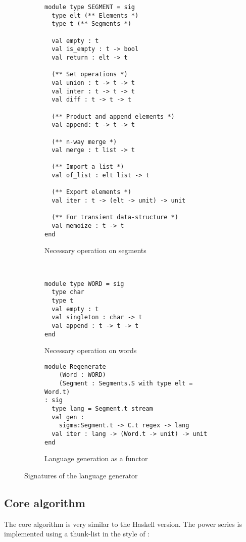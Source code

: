 \begin{figure}[h]
  \centering
  \begin{subfigure}{0.44\linewidth}
\begin{lstlisting}[basicstyle=\scriptsize\ttfamily]
module type SEGMENT = sig
  type elt (** Elements *)
  type t (** Segments *)

  val empty : t
  val is_empty : t -> bool
  val return : elt -> t

  (** Set operations *)
  val union : t -> t -> t
  val inter : t -> t -> t
  val diff : t -> t -> t

  (** Product and append elements *)
  val append: t -> t -> t

  (** n-way merge *)
  val merge : t list -> t

  (** Import a list *)
  val of_list : elt list -> t

  (** Export elements *)
  val iter : t -> (elt -> unit) -> unit

  (** For transient data-structure *)
  val memoize : t -> t
end
\end{lstlisting}
    \caption{Necessary operation on segments}
    \label{code:sigs:segment}
  \end{subfigure}~
  \begin{subfigure}{0.57\linewidth}
\begin{lstlisting}[basicstyle=\scriptsize\ttfamily]
module type WORD = sig
  type char
  type t
  val empty : t
  val singleton : char -> t
  val append : t -> t -> t
end
\end{lstlisting}
    \caption{Necessary operation on words}
    \label{code:sigs:word}
\begin{lstlisting}[basicstyle=\scriptsize\ttfamily]
module Regenerate
    (Word : WORD)
    (Segment : Segments.S with type elt = Word.t)
: sig
  type lang = Segment.t stream
  val gen : 
    sigma:Segment.t -> C.t regex -> lang
  val iter : lang -> (Word.t -> unit) -> unit
end
\end{lstlisting}
    \caption{Language generation as a functor}
    \label{code:sigs:regen}
  \end{subfigure}
  \caption{Signatures of the language generator}
  \label{code:sigs}
\end{figure}

\subsection{Core algorithm}

The core algorithm is very similar to the Haskell version. The power series
is implemented using a thunk-list in the style of \citet{DBLP:conf/cpp/Pottier17}:

